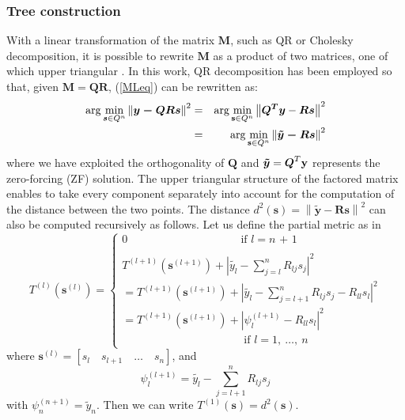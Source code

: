 \documentclass[12pt,onecolumn,draftclsnofoot]{IEEEtran}
\begin{document}
\subsubsection{Tree construction}
With a linear transformation of the matrix $\boldsymbol{M}$, such as
QR or Cholesky decomposition, it is possible to rewrite
$\boldsymbol{M}$ as a product of two matrices, one of which upper
triangular \cite{Caire&ot1}. In this work, QR decomposition has been
employed so that, given $\boldsymbol{M}=\boldsymbol{QR}$,
(\ref{MLeq}) can be rewritten as:
\begin{eqnarray}
\label{rw_sphere_const}
\arg \min_{\boldsymbol{s} \in Q^{n}} \left \| \boldsymbol{y - QRs} \right \|^2 & =
& \arg \min_{{\bf s} \in Q^{n}} \left \| \boldsymbol{Q^T y} - \boldsymbol{Rs} \right \|^2 \nonumber\\
& = & \arg \min_{{\bf s} \in Q^{n}} \left \| \boldsymbol{\tilde{y} - Rs} \right
\|^2
\end{eqnarray}
where we have exploited the orthogonality of $\boldsymbol{Q}$ and
$\boldsymbol{\tilde{y}}=\boldsymbol{Q}^T {\bf y}$ represents the
zero-forcing (ZF) solution. The upper triangular structure of the
factored matrix enables to take every component separately into
account for the computation of the distance between the two points.
The distance $d^2(\boldsymbol{s})= \left \| \boldsymbol{\tilde{y} -
Rs} \right \|^2$ can also be computed recursively as follows. Let
us define the partial metric as in~\cite{ethvlsi}
\begin{equation}
\label{MetrEq}
T^{(l)} (\boldsymbol{s}^{(l)}) = \left \{ \begin{array}{l}
0 \qquad \qquad \qquad \qquad \qquad \ \textrm{if $l = n$ + 1}\\
\\
T^{(l+1)}(\boldsymbol {s}^{(l+1)})+ | \tilde{y_l} -
\sum_{j=l}^{n} R_{lj}s_{j}|^2 \\
= T^{(l+1)}(\boldsymbol {s}^{(l+1)})+ | \tilde{y_l} -
\sum_{j=l+1}^{n} R_{lj}s_{j} - R_{ll}s_{l}|^2\\
= T^{(l+1)}(\boldsymbol {s}^{(l+1)})+ | \psi_l^{(l+1)}- R_{ll}s_{l}|^2\\
 \qquad \qquad \qquad \qquad \qquad \quad \textrm{if~}
l=1, ~ \ldots ,~ n
\end{array} \right.
\end{equation}
where $\boldsymbol {s}^{(l)}=[s_l \quad s_{l+1} \quad \dots \quad
s_{n}]$, and
\begin{equation}
\label{Psi} \psi_l^{(l+1)}= \tilde{y_l} - \sum_{j=l+1}^{n}
R_{lj}s_{j}
\end{equation}
\noindent with $\psi_n^{(n+1)}= \tilde{y}_n$. Then we can
write $T^{(1)}(\boldsymbol{s})=d^2(\boldsymbol{s})$.
\end{document}
